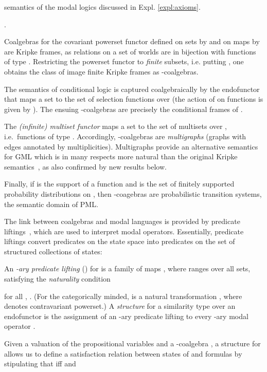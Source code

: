 \documentclass[proceedings]{stacs}
\theoremstyle{definition}
\theoremstyle{plain}
\newcounter{blubber}
\newenvironment{sparenumerate}
{\begin{list}
  {\arabic{blubber}.}
  {\usecounter{blubber}
   \setlength{\leftmargin}{0pt}
    \setlength{\parsep}{0pt}
    \setlength{\itemindent}{3ex}
    \setlength{\itemsep}{2pt}   
    \setlength{\listparindent}{3ex}
  }
}
{\end{list}}
\begin{document}
semantics of the modal logics discussed in Expl.
\ref{expl:axioms}.
\begin{exas}\label{expl:coalgml}
\begin{sparenumerate}
\item \label{item:Kripke} Coalgebras for the covariant powerset
  functor  defined on sets  by  and on maps  by  are Kripke
  frames, as relations  on a set  of worlds
  are in bijection with functions of type .
  Restricting the powerset functor to \emph{finite} subsets,
  i.e. putting , one obtains the class of image finite Kripke
  frames as -coalgebras. 
\item\label{item:cond} The semantics of conditional logic is captured
  coalgebraically by the endofunctor  that maps a set  to the
  set  of selection functions over  (the
  action of  on functions  is given by
  ).  The ensuing -coalgebras
  are precisely the conditional frames of \cite{Chellas80}.
\item\label{item:gml} The \emph{(infinite) multiset functor}
   maps a set  to the set  of multisets
  over , i.e.\ functions of type .
Accordingly, -coalgebras are \emph{multigraphs} (graphs
  with edges annotated by multiplicities). Multigraphs provide an
  alternative semantics for GML which is in many
  respects more natural than the original Kripke
  semantics~\cite{DAgostinoVisser02}, as also confirmed by new
  results below.
\item\label{item:pml} Finally, if  is the support of a function  and  is the set of finitely
  supported probability distributions on , then -coagebras
  are probabilistic transition systems, the semantic domain of
  PML.
\end{sparenumerate}
\end{exas}
\noindent The link between coalgebras and modal languages is provided
by predicate liftings~\cite{Pattinson03}, which are used to interpret
modal operators. Essentially, predicate liftings convert predicates on
the state space  into predicates on the set  of structured
collections of states:
\begin{defi}\label{def:lifting}\cite{Pattinson03}
  An \emph{-ary predicate lifting} () for 
  is a family of maps , where 
  ranges over all sets, satisfying the \emph{naturality} condition
  
  for all , . (For the
  categorically minded,  is a natural transformation
  , where  denotes
  contravariant powerset.) A \emph{structure} for a similarity type
   over an endofunctor  is the assignment of an -ary
  predicate lifting  to every -ary modal operator .
\end{defi}\noindent
\noindent Given a valuation  of the
propositional variables and a -coalgebra , a structure
for  allows us to define a satisfaction relation
 between states of  and formulas  by stipulating that  iff
 and
\end{document}
